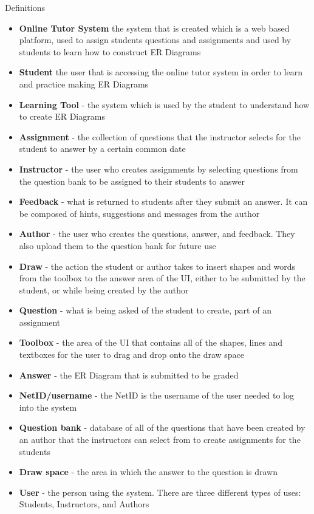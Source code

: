 	\begin{chapter}{Definitions}
 		\begin{itemize}
 			\item{\textbf{Online Tutor System}  the system that is created which is a web based platform, 
 			used to assign students questions and assignments and used by students to learn how to 
 			construct ER Diagrams}
			\item{\textbf{Student}  the user that is accessing the online tutor system in order to learn 
			and practice making ER Diagrams}
			\item{\textbf{Learning Tool} - the system which is used by the student to understand how to 
			create ER Diagrams}
			\item{\textbf{Assignment} - the collection of questions that the instructor selects for the 
			student to answer by a certain common date}
			\item{\textbf{Instructor} - the user who creates assignments by selecting questions from the 
			question bank to be assigned to their students to answer}
			\item{\textbf{Feedback} - what is returned to students after they submit an answer.  It can be 
			composed of hints, suggestions and messages from the author}
			\item{\textbf{Author} - the user who creates the questions, answer, and feedback.  They also 
			upload them to the question bank for future use}
			\item{\textbf{Draw} - the action the student or author takes to insert shapes and words from 
			the toolbox to the answer area of the UI, either to be submitted by the student, or while 
			being created by the author}
			\item{\textbf{Question} - what is being asked of the student to create, part of an assignment}
			\item{\textbf{Toolbox} - the area of the UI that contains all of the shapes, lines and textboxes 
			for the user to drag and drop onto the draw space}
			\item{\textbf{Answer} - the ER Diagram that is submitted to be graded}
			\item{\textbf{NetID/username} - the NetID is the username of the user needed to log into the 
			system}
			\item{\textbf{Question bank} - database of all of the questions that have been created by an 
			author that the instructors can select from to create assignments for the students}
			\item{\textbf{Draw space} - the area in which the answer to the question is drawn}
			\item{\textbf{User} - the person using the system. There are three different types of uses: 
			Students, Instructors, and Authors}
		\end{itemize}
	\end{chapter}
